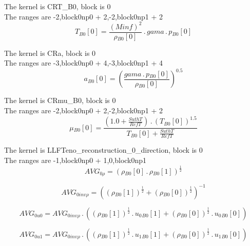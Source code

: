 \documentclass{article}
\begin{document}
\noindent The kernel is CRT_B0, block is 0\\\noindent The ranges are -2,block0np0 + 2,-2,block0np1 + 2\\\begin{dmath}{T{_{B0}}}[{0}] = \frac{\left(Minf \right)^{2}}{{\rho{_{B0}}}[{0}]} \,.\, gama \,.\, {p{_{B0}}}[{0}]\end{dmath}

\noindent The kernel is CRa, block is 0\\\noindent The ranges are -3,block0np0 + 4,-3,block0np1 + 4\\\begin{dmath}{a{_{B0}}}[{0}] = \left(\frac{gama \,.\, {p{_{B0}}}[{0}]}{{\rho{_{B0}}}[{0}]} \right)^{0.5}\end{dmath}

\noindent The kernel is CRmu_B0, block is 0\\\noindent The ranges are -2,block0np0 + 2,-2,block0np1 + 2\\\begin{dmath}{\mu{_{B0}}}[{0}] = \frac{\left(1.0 + \frac{SuthT}{RefT}\right) \,.\, \left({T{_{B0}}}[{0}] \right)^{1.5}}{{T{_{B0}}}[{0}] + \frac{SuthT}{RefT}}\end{dmath}

\noindent The kernel is LLFTeno_reconstruction_0_direction, block is 0\\\noindent The ranges are -1,block0np0 + 1,0,block0np1\\\begin{dmath}AVG_{0 \rho} = \left({\rho{_{B0}}}[{0}] \,.\, {\rho{_{B0}}}[{1}] \right)^{\frac{1}{2}}\end{dmath}

\begin{dmath}AVG_{0 inv \rho} = \left(\left({\rho{_{B0}}}[{1}] \right)^{\frac{1}{2}} + \left({\rho{_{B0}}}[{0}] \right)^{\frac{1}{2}} \right)^{-1}\end{dmath}

\begin{dmath}AVG_{0 u0} = AVG_{0 inv \rho} \,.\, \left(\left({\rho{_{B0}}}[{1}] \right)^{\frac{1}{2}} \,.\, {u_{0}{_{B0}}}[{1}] + \left({\rho{_{B0}}}[{0}] \right)^{\frac{1}{2}} \,.\, {u_{0}{_{B0}}}[{0}]\right)\end{dmath}

\begin{dmath}AVG_{0 u1} = AVG_{0 inv \rho} \,.\, \left(\left({\rho{_{B0}}}[{1}] \right)^{\frac{1}{2}} \,.\, {u_{1}{_{B0}}}[{1}] + \left({\rho{_{B0}}}[{0}] \right)^{\frac{1}{2}} \,.\, {u_{1}{_{B0}}}[{0}]\right)\end{dmath}
\end{document}
